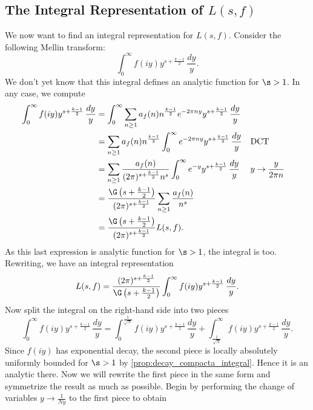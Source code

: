     \subsection*{The Integral Representation of \texorpdfstring{$L(s,f)$}{L(s,f)}}
      We now want to find an integral representation for $L(s,f)$. Consider the following Mellin transform:
      \[
        \int_{0}^{\infty}f(iy)y^{s+\frac{k-1}{2}}\,\frac{dy}{y}.
      \]
      We don't yet know that this integral defines an analytic function for $\s > 1$. In any case, we compute
      \begin{align*}
        \int_{0}^{\infty}f(iy)y^{s+\frac{k-1}{2}}\,\frac{dy}{y} &= \int_{0}^{\infty}\sum_{n \ge 1}a_{f}(n)n^{\frac{k-1}{2}}e^{-2\pi ny}y^{s+\frac{k-1}{2}}\,\frac{dy}{y} \\
        &= \sum_{n \ge 1}a_{f}(n)n^{\frac{k-1}{2}}\int_{0}^{\infty}e^{-2\pi ny}y^{s+\frac{k-1}{2}}\,\frac{dy}{y} &&\text{DCT} \\
        &= \sum_{n \ge 1}\frac{a_{f}(n)}{(2\pi)^{s+\frac{k-1}{2}}n^{s}}\int_{0}^{\infty}e^{-y}y^{s+\frac{k-1}{2}}\,\frac{dy}{y} &&\text{$y \to \frac{y}{2\pi n}$} \\
        &= \frac{\G\left(s+\frac{k-1}{2}\right)}{(2\pi)^{s+\frac{k-1}{2}}}\sum_{n \ge 1}\frac{a_{f}(n)}{n^{s}} \\
        &= \frac{\G\left(s+\frac{k-1}{2}\right)}{(2\pi)^{s+\frac{k-1}{2}}}L(s,f).
      \end{align*}
      As this last expression is analytic function for $\s > 1$, the integral is too. Rewriting, we have an integral representation
      \begin{equation}\label{equ:integral_representation_holomorphic_1}
        L(s,f) = \frac{(2\pi)^{s+\frac{k-1}{2}}}{\G\left(s+\frac{k-1}{2}\right)}\int_{0}^{\infty}f(iy)y^{s+\frac{k-1}{2}}\,\frac{dy}{y}.
      \end{equation}
      Now split the integral on the right-hand side into two pieces
      \begin{equation}\label{equ:symmetric_integral_holomorphic_split}
        \int_{0}^{\infty}f(iy)y^{s+\frac{k-1}{2}}\,\frac{dy}{y} = \int_{0}^{\frac{1}{\sqrt{N}}}f(iy)y^{s+\frac{k-1}{2}}\,\frac{dy}{y}+\int_{\frac{1}{\sqrt{N}}}^{\infty}f(iy)y^{s+\frac{k-1}{2}}\,\frac{dy}{y}.
      \end{equation}
      Since $f(iy)$ has exponential decay, the second piece is locally absolutely uniformly bounded for $\s > 1$ by \cref{prop:decay_compacta_integral}. Hence it is an analytic there. Now we will rewrite the first piece in the same form and symmetrize the result as much as possible. Begin by performing the change of variables $y \to \frac{1}{Ny}$ to the first piece to obtain
